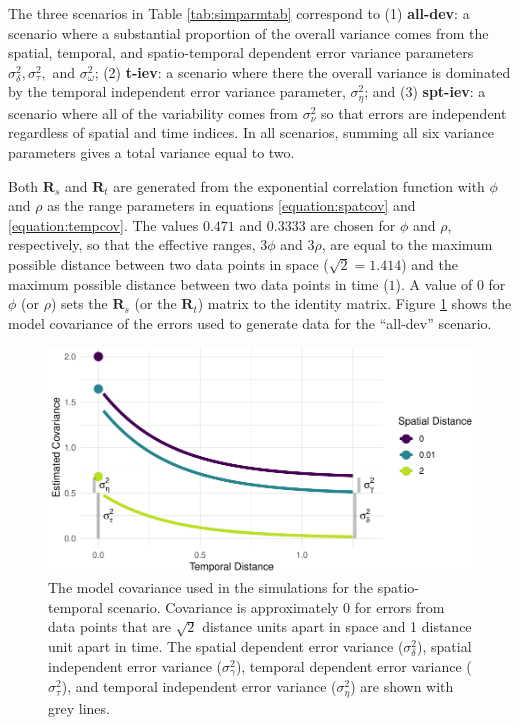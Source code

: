 \documentclass[]{article}    %
\begin{document}
The three scenarios in Table \ref{tab:simparmtab} correspond to (1)
\textbf{all-dev}: a scenario where a substantial proportion of the
overall variance comes from the spatial, temporal, and spatio-temporal
dependent error variance parameters
\(\sigma^2_{\delta}, \sigma^2_{\tau},\) and \(\sigma^2_{\omega}\); (2)
\textbf{t-iev}: a scenario where there the overall variance is dominated
by the temporal independent error variance parameter,
\(\sigma^2_{\eta}\); and (3) \textbf{spt-iev}: a scenario where all of
the variability comes from \(\sigma^2_{\nu}\) so that errors are
independent regardless of spatial and time indices. In all scenarios,
summing all six variance parameters gives a total variance equal to two.

Both \(\mathbf{R}_{s}\) and \(\mathbf{R}_t\) are generated from the
exponential correlation function with \(\phi\) and \(\rho\) as the range
parameters in equations \ref{equation:spatcov} and
\ref{equation:tempcov}. The values \(0.471\) and \(0.3333\) are chosen
for \(\phi\) and \(\rho\), respectively, so that the effective ranges,
\(3 \phi\) and \(3 \rho\), are equal to the maximum possible distance
between two data points in space (\(\sqrt2 = 1.414\)) and the maximum
possible distance between two data points in time (\(1\)). A value of 0
for \(\phi\) (or \(\rho\)) sets the \(\mathbf{R}_{s}\) (or the
\(\mathbf{R}_t\)) matrix to the identity matrix. Figure
\ref{fig:simcovplot} shows the model covariance of the errors used to
generate data for the ``all-dev'' scenario.

\begin{figure}
\centering
\includegraphics{model_cov.pdf}
\caption{\label{fig:simcovplot} The model covariance used in the
simulations for the spatio-temporal scenario. Covariance is
approximately 0 for errors from data points that are \(\sqrt2\) distance
units apart in space and 1 distance unit apart in time. The spatial
dependent error variance (\(\sigma^2_{\delta}\)), spatial independent
error variance (\(\sigma^2_{\gamma}\)), temporal dependent error
variance (\(\sigma^2_{\tau}\)), and temporal independent error variance
(\(\sigma^2_{\eta}\)) are shown with grey lines.}
\end{figure}
\end{document}
